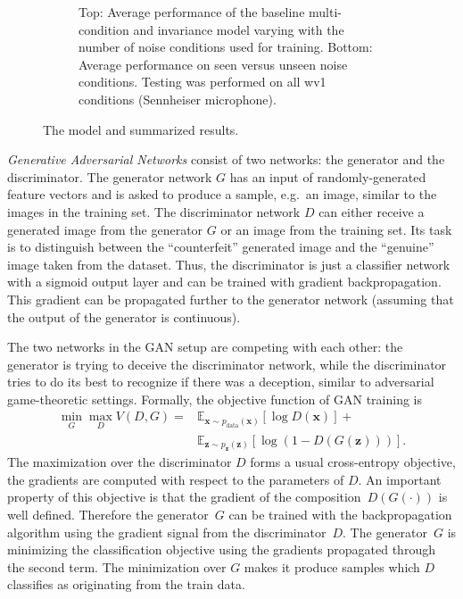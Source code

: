 \documentclass[a4paper]{article}
\begin{document}
\begin{figure}
\begin{subfigure}[b]{0.5\linewidth}
        \caption{Top: Average performance of the baseline multi-condition and invariance model varying with  the number of noise
            conditions used for training. Bottom: Average performance on seen versus unseen noise conditions.
            Testing was performed on all wv1 conditions (Sennheiser microphone).
            }
        \label{fig:results}
    \end{subfigure}
    \caption{The model and summarized results.}
\end{figure}
\emph{Generative Adversarial Networks} consist of two networks: the generator and the discriminator. 
    The generator network $G$ has an
    input of randomly-generated feature vectors and is asked to produce a
    sample, e.g.\ an image, similar to the images in the training set. The discriminator network $D$
    can either receive a generated image from the generator $G$ or an image
    from the training set. Its task is to distinguish
    between the ``counterfeit'' generated image and the ``genuine'' image taken from the dataset. Thus,
    the discriminator is just a classifier network with a sigmoid output layer
    and can be trained with gradient backpropagation. This gradient can be propagated further
    to the generator network (assuming that the output of the generator is
    continuous).

    The two networks in the GAN setup are competing with each other: the 
    generator is trying to deceive the discriminator network, while the discriminator tries
    to do its best to recognize if there was a deception, similar to adversarial game-theoretic settings.    
    Formally, the objective function of GAN training is
    \begin{align}
        \min_G \max_D V(D, G) = &\mathbb{E}_{\bm{x} \sim p_{\text{data}}(\bm{x})}[\log D(\bm{x})] + \\
            &\mathbb{E}_{\bm{z} \sim p_{\bm{z}}(\bm{z})}[\log (1 - D(G(\bm{z})))].
        \label{eq:gan}
    \end{align}
    The maximization over the discriminator $D$ forms a usual cross-entropy objective, the gradients are
    computed with respect to the parameters of $D$. An important property of
    this objective is that the gradient of the composition~$D(G(\cdot))$ is well
    defined. Therefore the generator~$G$ can be trained with the backpropagation
    algorithm using the gradient signal from the discriminator~$D$.
    The generator~$G$ is
    minimizing the classification objective using the gradients
    propagated through the second term. The minimization over $G$ makes it
    produce samples which $D$ classifies as originating from the train data.
\end{document}

